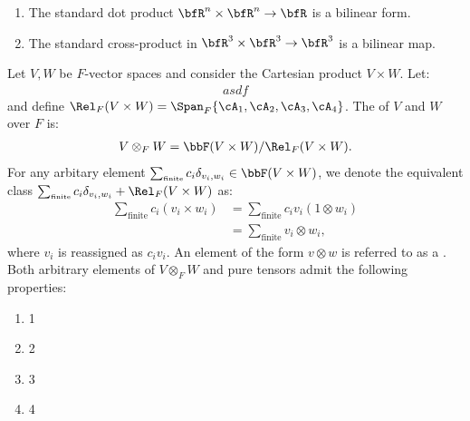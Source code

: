     \begin{example}
        \phantom{a}
        \begin{enumerate}
            \item The standard dot product $\bfR^n \times \bfR^n \rightarrow \bfR$ is a bilinear form.
            \item The standard cross-product in $\bfR^3 \times \bfR^3 \rightarrow \bfR^3$ is a bilinear map.
        \end{enumerate}
    \end{example}

    \begin{definition}
        Let $V,W$ be $F$-vector spaces and consider the Cartesian product $V \times W$. Let:
            \begin{equation*}
            \begin{split}
                asdf
            \end{split}
            \end{equation*}
        and define $\Rel_F(V \times W) = \Span_F\{\cA_1,\cA_2,\cA_3,\cA_4\}$. The  of $V$ and $W$ over $F$ is:
            \begin{equation*}
            \begin{split}
                V \otimes_F W = \bbF(V \times W)/\Rel_F(V \times W).
            \end{split}
            \end{equation*}
        For any arbitary element $\sum_{\text{\tiny finite}}c_i \delta_{v_i,w_i} \in \bbF(V \times W)$, we denote the equivalent class $\sum_{\text{\tiny finite}}c_i \delta_{v_i,w_i} + \Rel_F(V \times W)$ as:
            \begin{equation*}
            \begin{split}
                \sum_{\text{finite}}c_i(v_i \times w_i)
                & = \sum_{\text{finite}}c_i v_i(1 \otimes w_i) \\
                & = \sum_{\text{finite}}v_i \otimes w_i,
            \end{split}
            \end{equation*}
        where $v_i$ is reassigned as $c_i v_i $. An element of the form $v \otimes w$ is referred to as a . Both arbitrary elements of $V \otimes_F W$ and pure tensors admit the following properties:
            \begin{enumerate}[label = (\arabic*)]
                \item 1
                \item 2
                \item 3
                \item 4
            \end{enumerate}
    \end{definition}

